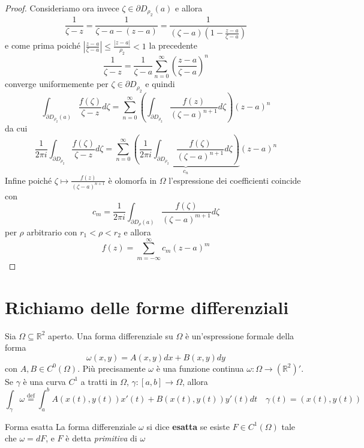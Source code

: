 \begin{proof}
Consideriamo ora invece \(\zeta \in \partial D_{\rho_{2}} {(a)}\) e allora
\[
    \frac{1}{\zeta -z} = \frac{1}{\zeta - a - {(z-a)}} = \frac{1}{{(\zeta
    -a)}{\left( 1 - \frac{z -a}{\zeta -a} \right)} }
\]
e come prima poiché \(\left| \frac{z -a}{\zeta -a} \right|\le \frac{|z-a|}{\rho_{2}} <
1 \)  la precedente 
\[
    \frac{1}{\zeta -z} = \frac{1}{\zeta -a} \sum_{n=0}^{\infty} {\left( \frac{z
    -a}{\zeta -a} \right)} ^{n} 
\]
converge uniformemente per \(\zeta \in \partial D_{\rho_{2}} \) e quindi
\[
    \int_{\partial D_{\rho_{2}}{(a)}} \frac{f{(\zeta)}}{\zeta - z} d \zeta =
    \sum_{n=0}^{\infty} {\left( \int_{\partial D_{\rho_{2}} }
            \frac{f{(z)}}{{(\zeta -a)}^{n+1}}d \zeta \right)} {(z -a)}^{n}
\]
da cui
\[
    \frac{1}{2\pi i} \int_{\partial D_{\rho_{2}} } \frac{f{(\zeta)}}{\zeta - z}
    d \zeta = \sum_{n=0}^{\infty} \underbrace{\left( \frac{1}{2 \pi i} \int_{\partial
    D_{\rho_{2}} } \frac{f{(\zeta)}}{{(\zeta - a)}^{n+1}}d \zeta \right)}_{c_{n}}  {(z-
a)}^{n}
\]
Infine poiché \(\zeta \mapsto \frac{f{(z)}}{{(\zeta-a)}^{n+1}}\) è olomorfa in
\(\Omega\) l'espressione dei coefficienti coincide con
\[
    c_{m} = \frac{1}{2\pi i} \int_{\partial D_\rho {(a)}}
    \frac{f{(\zeta)}}{{(\zeta -a)}^{m+1}} d \zeta
\]
per \(\rho\) arbitrario con \(r_{1} < \rho < r_{2}\) e allora
\[
    f{(z)} = \sum_{m=-\infty}^{\infty} c_{m} {(z-a)}^{m}
\]

\end{proof}


\newpage
\section{Richiamo delle forme differenziali}

Sia \(\Omega \subseteq \mathbb{R}^{2} \) aperto. Una forma differenziale su \(\Omega\) è
un'espressione formale della forma 
\[
    \omega(x, y) = A(x,y)dx + B(x,y) dy
\]
con \(A, B \in C^{0}(\Omega)\). Più precisamente \(\omega\) è una funzione
continua \(\omega: \Omega \to (\mathbb{R}^{2})'\). Se \(\gamma\) è una curva
\(C^{1}\) a tratti in \(\Omega\), \(\gamma : [a,b] \to \Omega\), allora
\[
    \int_{\gamma}\omega \overset{\text{def}}{=} \int_{a}^{b} A{(x(t), y(t))}
    x'{(t)} + B{(x(t), y(t))} y'{(t)} dt \quad \gamma{(t)} = (x(t), y(t))
\]
\begin{definition}{Forma esatta}
    La forma differenziale \(\omega\) si dice \textbf{esatta} se esiste \(F \in
    C^{1}(\Omega)\) tale che \(\omega = dF\), e \(F\) è detta \emph{primitiva}
    di \(\omega\) 
\end{definition}

